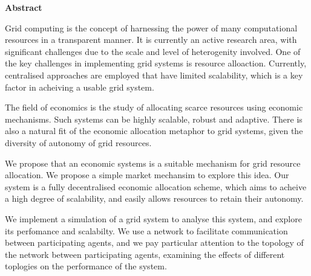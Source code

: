 \pagestyle{plain}
\setcounter{page}{1}

\begin{center}
    {\LARGE\bf Abstract}
\end{center}

Grid computing is the concept of harnessing the power of many computational
resources in a transparent manner. It is currently an active research area,
with significant challenges due to the scale and level of heterogenity
involved.  One of the key challenges in implementing grid systems is resource
alloaction.  Currently, centralised approaches are employed that have limited
scalability, which is a key factor in acheiving a usable grid system.

The field of economics is the study of allocating scarce resources using
economic mechanisms. Such systems can be highly scalable, robust and adaptive.
There is also a natural fit of the economic allocation metaphor to grid
systems, given the diversity of autonomy of grid resources.

We propose that an economic systems is a suitable mechanism for grid resource
allocation. We propose a simple market mechansim to explore this idea. Our
system is a fully decentralised economic allocation scheme, which aims to
acheive a high degree of scalability, and easily allows resources to retain
their autonomy.

We implement a simulation of a grid system to analyse this system, and explore
its perfomance and scalabilty. We use a network to facilitate communication
between participating agents, and we pay particular attention to the topology of
the network between participating agents, examining the effects of different
toplogies on the performance of the system.

\newpage

